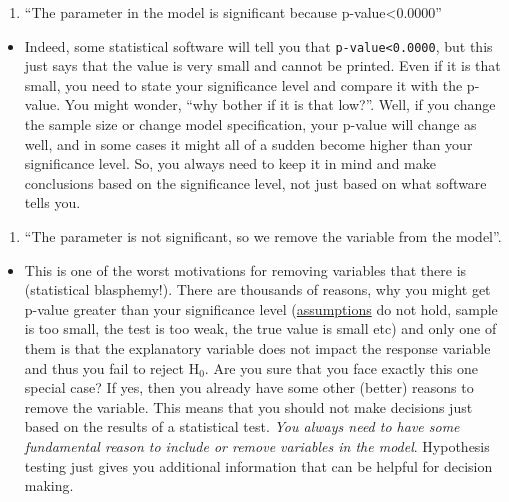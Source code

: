 \documentclass[
]{book}
\providecommand{\tightlist}{%
  \setlength{\itemsep}{0pt}\setlength{\parskip}{0pt}}
\theoremstyle{definition}
\theoremstyle{definition}
\theoremstyle{definition}
\theoremstyle{definition}
\theoremstyle{remark}
\begin{document}
\begin{enumerate}
\def\labelenumi{\arabic{enumi}.}
\setcounter{enumi}{4}
\tightlist
\item
  ``The parameter in the model is significant because p-value\textless0.0000''
\end{enumerate}

\begin{itemize}
\tightlist
\item
  Indeed, some statistical software will tell you that \texttt{p-value\textless{}0.0000}, but this just says that the value is very small and cannot be printed. Even if it is that small, you need to state your significance level and compare it with the p-value. You might wonder, ``why bother if it is that low?''. Well, if you change the sample size or change model specification, your p-value will change as well, and in some cases it might all of a sudden become higher than your significance level. So, you always need to keep it in mind and make conclusions based on the significance level, not just based on what software tells you.
\end{itemize}

\begin{enumerate}
\def\labelenumi{\arabic{enumi}.}
\setcounter{enumi}{5}
\tightlist
\item
  ``The parameter is not significant, so we remove the variable from the model''.
\end{enumerate}

\begin{itemize}
\tightlist
\item
  This is one of the worst motivations for removing variables that there is (statistical blasphemy!). There are thousands of reasons, why you might get p-value greater than your significance level (\protect\hyperlink{assumptions}{assumptions} do not hold, sample is too small, the test is too weak, the true value is small etc) and only one of them is that the explanatory variable does not impact the response variable and thus you fail to reject \(\mathrm{H}_0\). Are you sure that you face exactly this one special case? If yes, then you already have some other (better) reasons to remove the variable. This means that you should not make decisions just based on the results of a statistical test. \emph{You always need to have some fundamental reason to include or remove variables in the model}. Hypothesis testing just gives you additional information that can be helpful for decision making.
\end{itemize}
\end{document}
